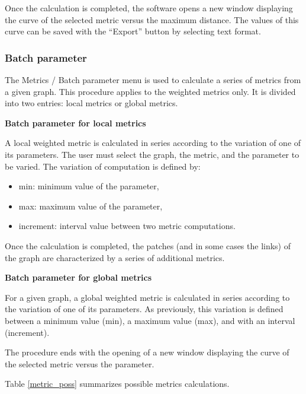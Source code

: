 \documentclass{article}
\begin{document}
Once the calculation is completed, the software opens a new window displaying the curve of the selected metric versus the maximum distance. The values of this curve can be saved with the “Export” button by selecting text format.

\subsubsection{Batch parameter}
\label{batch_metric}
The Metrics / Batch parameter menu is used to calculate a series of metrics from a given graph. This procedure applies to the weighted metrics only. It is divided into two entries: local metrics or global metrics.

\textbf{Batch parameter for local metrics}

A local weighted metric is calculated in series according to the variation of one of its parameters. The user must select the graph, the metric, and the parameter to be varied. The variation of computation is defined by:
\begin{itemize}
	\item min: minimum value of the parameter,
	\item max: maximum value of the parameter,
	\item increment: interval value between two metric computations.
\end{itemize}

Once the calculation is completed, the patches (and in some cases the links) of the graph are characterized by a series of additional metrics.

\textbf{Batch parameter for global metrics}

For a given graph, a global weighted metric is calculated in series according to the variation of one of its parameters. As previously, this variation is defined between a minimum value (min), a maximum value (max), and with an interval (increment). 

The procedure ends with the opening of a new window displaying the curve of the selected metric versus the parameter. 

Table \ref{metric_poss} summarizes possible metrics calculations.
\end{document}
